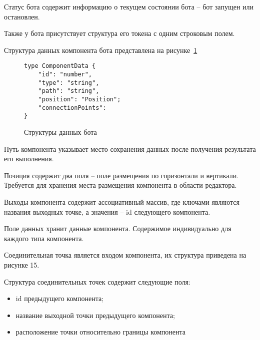Статус бота содержит информацию о текущем состоянии бота – бот
запущен или остановлен.

Также у бота присутствует структура его токена с одним строковым
полем.

Структура данных компонента бота представлена на
рисунке~\ref{f:component-data-struct-code}

\begin{figure}[ht]
	\centering
	\vspace{\toppaddingoffigure}
	\begin{lstlisting}
type ComponentData {
    "id": "number",
    "type": "string",
    "path": "string",
    "position": "Position";
    "connectionPoints": 
}
    \end{lstlisting}
	\caption{Структуры данных бота}
	\label{f:component-data-struct-code}
\end{figure}

Путь компонента указывает место сохранения данных после получения
результата его выполнения.

Позиция содержит два поля – поле размещения по горизонтали и
вертикали. Требуется для хранения места размещения компонента в области
редактора.

Выходы компонента содержит ассоциативный массив, где ключами
являются названия выходных точке, а значения – id следующего компонента.

Поле данных хранит данные компонента. Содержимое индивидуально
для каждого типа компонента.

Соединительная точка является входом компонента, их структура
приведена на рисунке 15.

Структура соединительных точек содержит следующие поля:

\begin{itemize}
	\item id предыдущего компонента;
	\item название выходной точки предыдущего компонента;
	\item расположение точки относительно границы компонента
\end{itemize}
